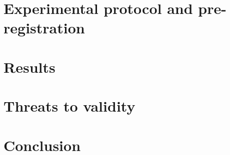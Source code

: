 \documentclass[11pt]{article}
\begin{document}
\section{Experimental protocol and pre-registration}\label{sec:protocol}


\section{Results}\label{sec:results}


\section{Threats to validity}\label{sec:threats}


\section{Conclusion}




\end{document}
